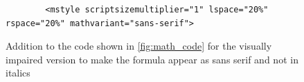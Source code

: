 \begin{figure}
	
	\begin{lstlisting}
		<mstyle scriptsizemultiplier="1" lspace="20%" rspace="20%" mathvariant="sans-serif">
	\end{lstlisting}
	\caption{Addition to the code shown in \ref{fig:math_code} for the visually impaired version to make the formula appear as sans serif and not in italics}
		\label{fig:math_vi_code}
\end{figure}


